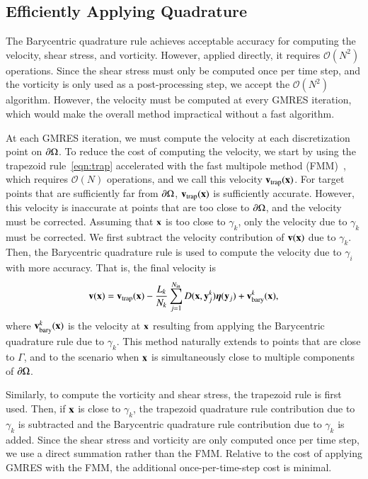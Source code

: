 \documentclass[preprint, 10pt]{elsarticle}
\begin{document}
\subsection{Efficiently Applying Quadrature}
\label{sec:fmm}
The Barycentric quadrature rule achieves acceptable accuracy for
computing the velocity, shear stress, and vorticity.  However, applied
directly, it requires $\mathcal{O}(N^2)$ operations.  Since the shear
stress must only be computed once per time step, and the vorticity is
only used as a post-processing step, we accept the $\mathcal{O}(N^2)$
algorithm.  However, the velocity must be computed at every GMRES
iteration, which would make the overall method impractical without a
fast algorithm.

At each GMRES iteration, we must compute the velocity at each
discretization point on ${\partial}\Omega$.  To reduce the cost of computing
the velocity, we start by using the trapezoid rule~\eqref{eqn:trap}
accelerated with the fast multipole method (FMM)~\cite{gre-rok1987},
which requires $\mathcal{O}(N)$ operations, and we call this velocity
${\mathbf{v}}_{\mathrm{trap}}({\mathbf{x}})$.  For target points that are sufficiently far from
${\partial}\Omega$, ${\mathbf{v}}_{\mathrm{trap}}({\mathbf{x}})$ is sufficiently accurate.  However, this
velocity is inaccurate at points that are too close to ${\partial}\Omega$, and
the velocity must be corrected.  Assuming that ${\mathbf{x}}$ is too close to
$\gamma_k$, only the velocity due to $\gamma_k$ must be corrected. We
first subtract the velocity contribution of ${\mathbf{v}}({\mathbf{x}})$ due to
$\gamma_k$.  Then, the Barycentric quadrature rule is used to compute
the velocity due to $\gamma_i$ with more accuracy.  That is, the final
velocity is
\begin{align}
  {\mathbf{v}}({\mathbf{x}}) = {\mathbf{v}}_{\mathrm{trap}}({\mathbf{x}}) - \frac{L_k}{N_k} \sum_{j=1}^{N_{\mathrm{in}}} 
    D({\mathbf{x}},{\mathbf{y}}^k_j) {\boldsymbol\eta}({\mathbf{y}}_j) + {\mathbf{v}}^k_{\mathrm{bary}}({\mathbf{x}}),
\end{align}
where ${\mathbf{v}}^k_{\mathrm{bary}}({\mathbf{x}})$ is the velocity at ${\mathbf{x}}$ resulting from
applying the Barycentric quadrature rule due to $\gamma_k$.  This method
naturally extends to points that are close to $\Gamma$, and to the
scenario when ${\mathbf{x}}$ is simultaneously close to multiple components of
${\partial}\Omega$.

Similarly, to compute the vorticity and shear stress, the trapezoid rule
is first used.  Then, if ${\mathbf{x}}$ is close to $\gamma_k$, the trapezoid
quadrature rule contribution due to $\gamma_k$ is subtracted and the
Barycentric quadrature rule contribution due to $\gamma_k$ is added.
Since the shear stress and vorticity are only computed once per time
step, we use a direct summation rather than the FMM.  Relative to the
cost of applying GMRES with the FMM, the additional once-per-time-step
cost is minimal.
\end{document}
